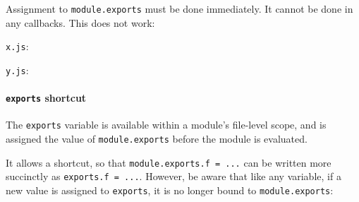 Assignment to \texttt{module.exports} must be done immediately. It
cannot be done in any callbacks. This does not work:

\texttt{x.js}:

\begin{Shaded}
\begin{Highlighting}[]
\NormalTok{(() }\KeywordTok{=\textgreater{}}\NormalTok{ \{}
 \OperatorTok{=}\NormalTok{ \{ }\OperatorTok{:} \NormalTok{ \}}\OperatorTok{;}
\NormalTok{\}}\OperatorTok{,} \NormalTok{)}\OperatorTok{;}
\end{Highlighting}
\end{Shaded}

\texttt{y.js}:

\begin{Shaded}
\begin{Highlighting}[]
\OperatorTok{=} \NormalTok{(}\NormalTok{)}\OperatorTok{;}
\NormalTok{)}\OperatorTok{;}
\end{Highlighting}
\end{Shaded}

\paragraph{\texorpdfstring{\texttt{exports}
shortcut}{exports shortcut}}\label{exports-shortcut}

The \texttt{exports} variable is available within a module's file-level
scope, and is assigned the value of \texttt{module.exports} before the
module is evaluated.

It allows a shortcut, so that \texttt{module.exports.f\ =\ ...} can be
written more succinctly as \texttt{exports.f\ =\ ...}. However, be aware
that like any variable, if a new value is assigned to \texttt{exports},
it is no longer bound to \texttt{module.exports}:

\begin{Shaded}
\begin{Highlighting}[]
 \OperatorTok{=} \OperatorTok{;} 
\OperatorTok{=}\NormalTok{ \{ }\OperatorTok{:} \NormalTok{ \}}\OperatorTok{;}  
\end{Highlighting}
\end{Shaded}

